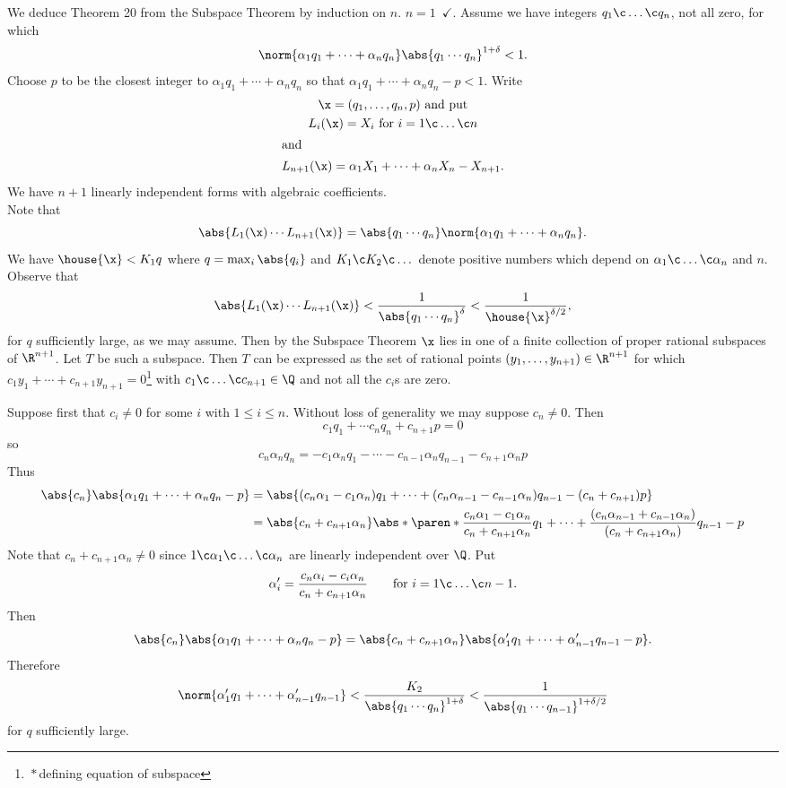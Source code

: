 We deduce Theorem 20 from the Subspace Theorem by induction on $n$.  $n=1$~$\checkmark$.  Assume we have integers $q_1\c \dotsc\c q_n$, not all zero, for which
\[ \norm{\alpha_1q_1+\dotsb+\alpha_nq_n}\abs{q_1\dotsm q_n}^{1+\delta} < 1 . \]
Choose $p$ to be the closest integer to $\alpha_1q_1+\dotsb+\alpha_nq_n$ so that $\alpha_1q_1+\dotsb+\alpha_nq_n-p<1$.  Write
\begin{gather*}
\x = (q_1,\dotsc,q_n,p) \text{ and put} \\
L_i(\x) = X_i \text{ for $i=1\c \dotsc\c n$} \\
\shortintertext{and}
L_{n+1}(\x) = \alpha_1X_1+\dotsb+\alpha_nX_n-X_{n+1} .
\end{gather*}
We have $n+1$ linearly independent forms with algebraic coefficients. \\
Note that
\[ \abs{L_1(\x)\dotsm L_{n+1}(\x)} = \abs{q_1\dotsm q_n}\norm{\alpha_1q_1+\dotsb+\alpha_nq_n} . \]
We have $\house{\x}<K_1q$ where $q=\max_i\abs{q_i}$ and $K_1\c K_2\c \dotsc$ denote positive numbers which depend on $\alpha_1\c \dotsc\c \alpha_n$ and $n$. %
Observe that
\[ \abs{L_1(\x)\dotsm L_{n+1}(\x)} < \frac{1}{\abs{q_1\dotsm q_n}^\delta} < \frac{1}{\house{\x}^{\delta/2}} , \]
for $q$ sufficiently large, as we may assume.  Then by the Subspace Theorem $\x$ lies in one of a finite collection of proper rational subspaces of $\R^{n+1}$.  Let $T$ be such a subspace.  Then $T$ can be expressed as the set of rational points $(y_1,\dotsc,y_{n+1})\in\R^{n+1}$ for which $c_1y_1+\dotsb+c_{n+1}y_{n+1}=0$\footnote{\,$*$\;\,defining equation of subspace} with $c_1\c \dotsc\c c_{n+1}\in\Q$ and not all the $c_i$s are zero.

Suppose first that $c_i\neq0$ for some $i$ with $1\leq i\leq n$.  Without loss of generality we may suppose $c_n\neq0$.  Then
\[ c_1q_1+\dotsb c_nq_n + c_{n+1}p = 0 \]
so
\[ c_n\alpha_nq_n = -c_1\alpha_nq_1 - \dotsb -c_{n-1}\alpha_nq_{n-1} - c_{n+1}\alpha_np \]
Thus
\begin{align*}
\abs{c_n}\abs{\alpha_1q_1+\dotsb+\alpha_nq_n-p}
&= \abs{(c_n\alpha_1-c_1\alpha_n)q_1+\dotsb+(c_n\alpha_{n-1}-c_{n-1}\alpha_n)q_{n-1}-(c_n+c_{n+1})p} \\
&= \abs{c_n+c_{n+1}\alpha_n}\abs*{\paren*{\frac{c_n\alpha_1-c_1\alpha_n}{c_n+c_{n+1}\alpha_n}}q_1+\dotsb+\frac{(c_n\alpha_{n-1}+c_{n-1}\alpha_n)}{(c_n+c_{n+1}\alpha_n)}q_{n-1}-p}
\end{align*}
Note that $c_n+c_{n+1}\alpha_n\neq0$ since $1\c \alpha_1\c \dotsc\c \alpha_n$ are linearly independent over $\Q$.  Put
\[ \alpha'_i = \frac{c_n\alpha_i-c_i\alpha_n}{c_n+c_{n+1}\alpha_n} \qquad\text{for $i=1\c \dotsc\c n-1$} . \]
Then
\[ \abs{c_n}\abs{\alpha_1q_1+\dotsb+\alpha_nq_n-p} = \abs{c_n+c_{n+1}\alpha_n}\abs{\alpha'_1q_1+\dotsb+\alpha'_{n-1}q_{n-1}-p} . \]
Therefore
\[ \norm{\alpha'_1q_1+\dotsb+\alpha'_{n-1}q_{n-1}} < \frac{K_2}{\abs{q_1\dotsm q_n}^{1+\delta}} < \frac{1}{\abs{q_1\dotsm q_{n-1}}^{1+\delta/2}} \]
for $q$ sufficiently large.

